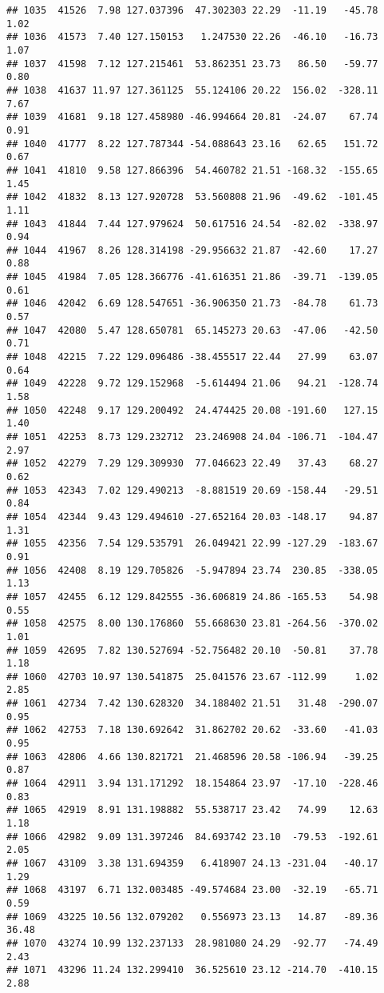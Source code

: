 \documentclass[]{article}
\begin{document}
\begin{verbatim}
## 1035  41526  7.98 127.037396  47.302303 22.29  -11.19   -45.78  1.02
## 1036  41573  7.40 127.150153   1.247530 22.26  -46.10   -16.73  1.07
## 1037  41598  7.12 127.215461  53.862351 23.73   86.50   -59.77  0.80
## 1038  41637 11.97 127.361125  55.124106 20.22  156.02  -328.11  7.67
## 1039  41681  9.18 127.458980 -46.994664 20.81  -24.07    67.74  0.91
## 1040  41777  8.22 127.787344 -54.088643 23.16   62.65   151.72  0.67
## 1041  41810  9.58 127.866396  54.460782 21.51 -168.32  -155.65  1.45
## 1042  41832  8.13 127.920728  53.560808 21.96  -49.62  -101.45  1.11
## 1043  41844  7.44 127.979624  50.617516 24.54  -82.02  -338.97  0.94
## 1044  41967  8.26 128.314198 -29.956632 21.87  -42.60    17.27  0.88
## 1045  41984  7.05 128.366776 -41.616351 21.86  -39.71  -139.05  0.61
## 1046  42042  6.69 128.547651 -36.906350 21.73  -84.78    61.73  0.57
## 1047  42080  5.47 128.650781  65.145273 20.63  -47.06   -42.50  0.71
## 1048  42215  7.22 129.096486 -38.455517 22.44   27.99    63.07  0.64
## 1049  42228  9.72 129.152968  -5.614494 21.06   94.21  -128.74  1.58
## 1050  42248  9.17 129.200492  24.474425 20.08 -191.60   127.15  1.40
## 1051  42253  8.73 129.232712  23.246908 24.04 -106.71  -104.47  2.97
## 1052  42279  7.29 129.309930  77.046623 22.49   37.43    68.27  0.62
## 1053  42343  7.02 129.490213  -8.881519 20.69 -158.44   -29.51  0.84
## 1054  42344  9.43 129.494610 -27.652164 20.03 -148.17    94.87  1.31
## 1055  42356  7.54 129.535791  26.049421 22.99 -127.29  -183.67  0.91
## 1056  42408  8.19 129.705826  -5.947894 23.74  230.85  -338.05  1.13
## 1057  42455  6.12 129.842555 -36.606819 24.86 -165.53    54.98  0.55
## 1058  42575  8.00 130.176860  55.668630 23.81 -264.56  -370.02  1.01
## 1059  42695  7.82 130.527694 -52.756482 20.10  -50.81    37.78  1.18
## 1060  42703 10.97 130.541875  25.041576 23.67 -112.99     1.02  2.85
## 1061  42734  7.42 130.628320  34.188402 21.51   31.48  -290.07  0.95
## 1062  42753  7.18 130.692642  31.862702 20.62  -33.60   -41.03  0.95
## 1063  42806  4.66 130.821721  21.468596 20.58 -106.94   -39.25  0.87
## 1064  42911  3.94 131.171292  18.154864 23.97  -17.10  -228.46  0.83
## 1065  42919  8.91 131.198882  55.538717 23.42   74.99    12.63  1.18
## 1066  42982  9.09 131.397246  84.693742 23.10  -79.53  -192.61  2.05
## 1067  43109  3.38 131.694359   6.418907 24.13 -231.04   -40.17  1.29
## 1068  43197  6.71 132.003485 -49.574684 23.00  -32.19   -65.71  0.59
## 1069  43225 10.56 132.079202   0.556973 23.13   14.87   -89.36 36.48
## 1070  43274 10.99 132.237133  28.981080 24.29  -92.77   -74.49  2.43
## 1071  43296 11.24 132.299410  36.525610 23.12 -214.70  -410.15  2.88

\end{verbatim}
\end{document}
